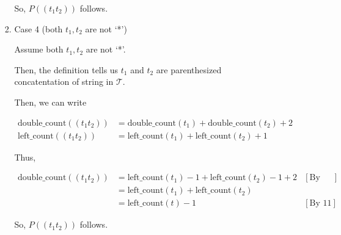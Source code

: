 \documentclass[12pt]{article}
\begin{document}
\begin{enumerate}[a.]
\begin{mdframed}
\begin{enumerate}[1.]
\begin{mdframed}
\begin{enumerate}[1.]
\begin{mdframed}
            \bigskip

            So, $P((t_1t_2))$ follows.
            \end{mdframed}

            \item Case 4 (both $t_1,t_2$ are not `*')

            \begin{mdframed}
            Assume both $t_1,t_2$ are not `*'.

            \bigskip

            Then, the definition tells us $t_1$ and $t_2$ are
            parenthesized concatentation of string in $\mathcal{T}$.

            \bigskip

            Then, we can write

            \begin{align}
                \text{double\_count}((t_1t_2)) &= \text{double\_count}(t_1) + \text{double\_count}(t_2) + 2\\
                \text{left\_count}((t_1t_2)) &= \text{left\_count}(t_1) + \text{left\_count}(t_2) + 1
            \end{align}

            \bigskip

            Thus,

            \begin{align}
                \text{double\_count}((t_1t_2)) &= \text{left\_count}(t_1) - 1 + \text{left\_count}(t_2) - 1 + 2 & [\text{By I.H}]\\
                &= \text{left\_count}(t_1) + \text{left\_count}(t_2)\\
                &= \text{left\_count}(t) - 1 & [\text{By 11}]
            \end{align}
            \end{mdframed}

            \bigskip

            So, $P((t_1t_2))$ follows.

        \end{enumerate}

        \end{mdframed}
    \end{enumerate}
    \end{mdframed}



\end{enumerate}
\end{document}
